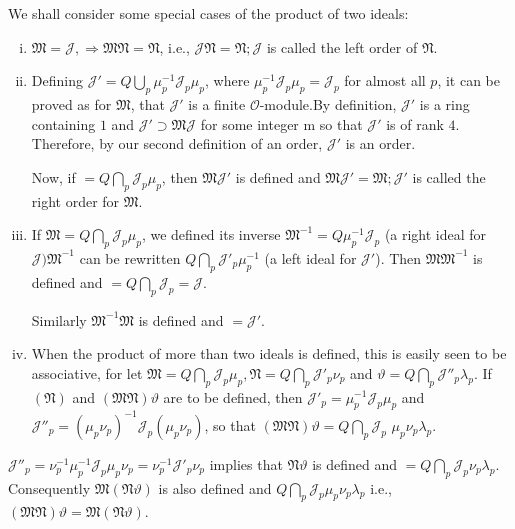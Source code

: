 We shall consider some special cases of the product of two ideals:
\begin{enumerate}[i)]
\item $\mathfrak{M} = \mathcal{J}, \Rightarrow \mathfrak{M}\mathfrak{N} =
  \mathfrak{N}$, i.e., $\mathcal{J} \mathfrak{N} = \mathfrak{N};
  \mathcal{J}$ is called the left order of $\mathfrak{N}$. 
\item Defining $\mathcal{J}' = Q \bigcup \limits_{p} \mu^{-1}_p
  \mathcal{J}_p \mu_p$, where $\mu^{-1}_p \mathcal{J}_p \mu_p =
  \mathcal{J}_p$ for almost all $p$, it can be proved as for
  $\mathfrak{M}$, that $\mathcal{J}'$ is a finite
  $\mathscr{O}$-module.\pageoriginale By definition, $\mathcal{J}'$ is a ring
  containing $1$ and $\mathcal{J}' \supset \mathfrak{M} \mathcal{J}$
  for some integer m so that $\mathcal{J}'$ is of rank $4$. Therefore,
  by our second definition of an order, $\mathcal{J}'$ is an order. 
  
  Now, if $= Q \bigcap \limits_{p} \mathcal{J}_p \mu_p$, then
  $\mathfrak{M} \mathcal{J}'$ is defined and $\mathfrak{M} \mathcal{J}'
  = \mathfrak{M}; \mathcal{J}'$ is called the right order for
  $\mathfrak{M}$. 
\item If $\mathfrak{M} = Q \bigcap \limits_{p} \mathcal{J}_p \mu_p$,
  we defined its inverse $\mathfrak{M}^{-1} = Q \mu^{-1}_p
  \mathcal{J}_p$ (a right ideal for $\mathcal{J}) \mathfrak{M}^{-1}$
  can be rewritten $Q \bigcap \limits_{p} \mathcal{J}'_p \mu^{-1}_p $
  (a left ideal for $\mathcal{J}'$). Then $\mathfrak{M}
  \mathfrak{M}^{-1}$ is defined and $= Q \bigcap \limits_{p}
  \mathcal{J}_p = \mathcal{J}$. 

  Similarly $\mathfrak{M}^{-1} \mathfrak{M}$ is defined and $= \mathcal{J}'$.
\item When the product of more than two ideals is defined, this is
  easily seen to be associative, for let $\mathfrak{M}= Q \bigcap \limits_{p}
  \mathcal{J}_p \mu_p,  \mathfrak{N} = Q \bigcap \limits_{p}
  \mathcal{J}'_p \nu_p$ and $\vartheta = Q \bigcap \limits_{p}
  \mathcal{J}''_p \lambda_p$. If $(\mathfrak{N})$ and $(\mathfrak{M}
  \mathfrak{N}) \vartheta$ are to be defined, then $\mathcal{J}'_p =
  \mu^{-1}_p \mathcal{J}_p \mu_p$ and $\mathcal{J}''_p = (\mu_p
  \nu_p)^{-1} \mathcal{J}_p (\mu_p \nu_p)$, so that $(\mathfrak{M}\mathfrak{N})
  \vartheta = Q \bigcap \limits_{p} \mathcal{J}_p$ $\mu_p \nu_p
  \lambda_p$. 
\end{enumerate} 

$\mathcal{J}''_p = \nu^{-1}_p \mu^{-1}_p \mathcal{J}_p \mu_p \nu_p =
\nu^{-1}_p \mathcal{J}'_p \nu_p$ implies that $\mathfrak{N} \vartheta$
is defined and $=Q \bigcap \limits_{p} \mathcal{J}_p  \nu_p
\lambda_p$. Consequently $\mathfrak{M} (\mathfrak{N} \vartheta)$ is
also defined and $Q \bigcap \limits_{p} \mathcal{J}_p \mu_p \nu_p
\lambda_p$ i.e., $(\mathfrak{M} \mathfrak{N})\vartheta = \mathfrak{M}
(\mathfrak{N} \vartheta)$. 

